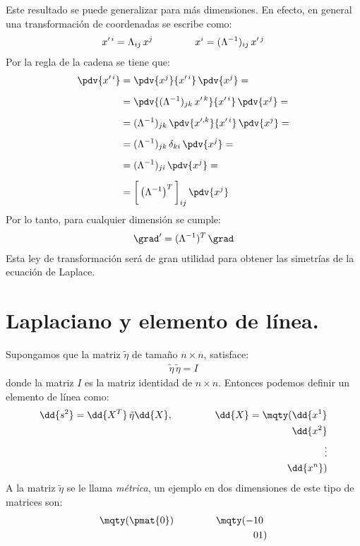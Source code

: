 Este resultado se puede generalizar para más dimensiones. En efecto, en general una transformación de coordenadas se escribe como:
\begin{align}
x^{\prime \, i} = \Lambda_{ij} \, x^{j} \hspace{1.5cm} x^{i} = (\Lambda^{-1})_{ij} \, x^{\prime \, j}
\label{eq:ecuacion_10_016}
\end{align}
Por la regla de la cadena se tiene que:
\begin{align}
\begin{aligned}[b]
\pdv{x^{\prime \, i}} &= \pdv{x^{j}}{x^{\prime \, i}} \, \pdv{x^{j}} = \\[0.5em]
&= \pdv{(\Lambda^{-1})_{jk} \, x^{\prime \, k}}{x^{\prime \, i}} \, \pdv{x^{j}} = \\[0.5em]
&= (\Lambda^{-1})_{jk} \, \pdv{x^{\prime , k}}{x^{\prime \, i}} \, \pdv{x^{j}} =  \\[0.5em]
&= (\Lambda^{-1})_{jk} \, \delta_{ki} \, \pdv{x^{j}} =  \\[0.5em]
&= (\Lambda^{-1})_{ji} \, \pdv{x^{j}} = \\[0.5em]
&= \bigg[ \left( \Lambda^{-1} \right)^{T} \bigg]_{ij} \, \pdv{x^{j}}
\end{aligned}
\label{eq:ecuacion_10_017}
\end{align}
Por lo tanto, para cualquier dimensión se cumple:
\begin{align}
\grad^{\prime} = (\Lambda^{-1})^{T} \, \grad
\label{eq:ecuacion_10_018}
\end{align}
Esta ley de transformación será de gran utilidad para obtener las simetrías de la ecuación de Laplace.

\section{Laplaciano y elemento de línea.}

Supongamos que la matriz $\tilde{\eta}$ de tamaño $n \times n$, satisface:
\begin{align}
\tilde{\eta} \, \tilde{\eta} = I
\label{eq:ecuacion_10_019}
\end{align}
donde la matriz $I$ es la matriz identidad de $n \times n$. Entonces podemos definir un elemento de línea como:
\begin{align}
\dd{s^{2}} = \dd{X^{T}} \, \tilde{\eta} \dd{X}, \hspace{1.5cm} \dd{X} = \mqty(\dd{x^{1}} \\ \dd{x^{2}} \\ \vdots \\ \dd{x^{n}})
\label{eq:ecuacion_10_020}
\end{align}
A la matriz $\tilde{\eta}$ se le llama \emph{métrica}, un ejemplo en dos dimensiones de este tipo de matrices son:
\begin{align}
\mqty(\pmat{0}) \hspace{1.5cm} \mqty(-1 & 0 \\ 0 & 1)
\label{eq:ecuacion_10_021}
\end{align}

